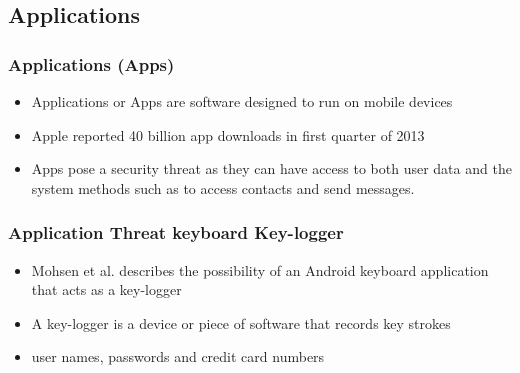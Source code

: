 \documentclass{beamer}
\begin{document}
	\subsection{Applications}
		\begin{frame}
		\frametitle{Applications (Apps)}
		\begin{itemize}
		\item Applications or Apps are software designed to run on mobile devices 
		\item Apple reported 40 billion app downloads in first quarter of 2013 
		\item Apps pose a security threat as they can have access to both user data and the system methods such as to access contacts and send messages.
		\end{itemize}
		\end{frame}
		\begin{frame}
		\frametitle{Application Threat keyboard Key-logger}
		\begin{itemize}
		\item Mohsen et al. describes the possibility of an Android keyboard application that acts as a key-logger
		\item A key-logger is a device or piece of software that records key strokes
		\item user names, passwords and credit card numbers  
		\end{itemize}
		\end{frame}
\end{document}
